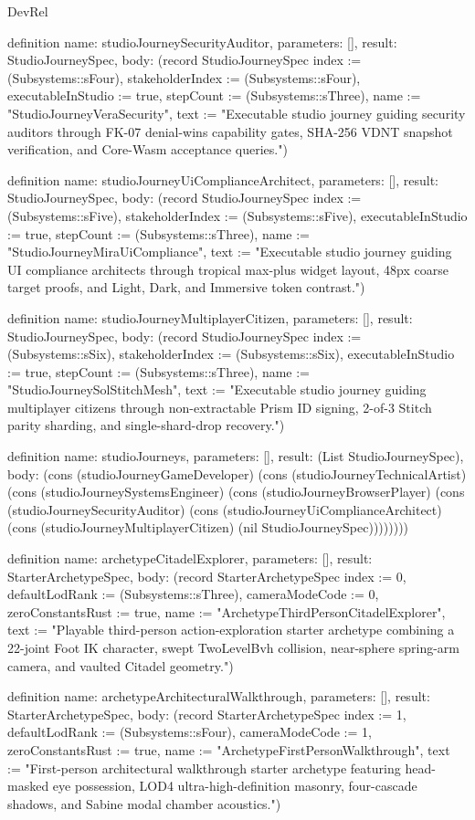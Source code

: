 \begin{lexlean}{DevRel}
\begin{semanticmodule}
definition{
  name: studioJourneySecurityAuditor,
  parameters: [],
  result: StudioJourneySpec,
  body: (record StudioJourneySpec {index := (Subsystems::sFour), stakeholderIndex := (Subsystems::sFour), executableInStudio := true, stepCount := (Subsystems::sThree), name := "StudioJourneyVeraSecurity", text := "Executable studio journey guiding security auditors through FK-07 denial-wins capability gates, SHA-256 VDNT snapshot verification, and Core-Wasm acceptance queries."})
}

definition{
  name: studioJourneyUiComplianceArchitect,
  parameters: [],
  result: StudioJourneySpec,
  body: (record StudioJourneySpec {index := (Subsystems::sFive), stakeholderIndex := (Subsystems::sFive), executableInStudio := true, stepCount := (Subsystems::sThree), name := "StudioJourneyMiraUiCompliance", text := "Executable studio journey guiding UI compliance architects through tropical max-plus widget layout, 48px coarse target proofs, and Light, Dark, and Immersive token contrast."})
}

definition{
  name: studioJourneyMultiplayerCitizen,
  parameters: [],
  result: StudioJourneySpec,
  body: (record StudioJourneySpec {index := (Subsystems::sSix), stakeholderIndex := (Subsystems::sSix), executableInStudio := true, stepCount := (Subsystems::sThree), name := "StudioJourneySolStitchMesh", text := "Executable studio journey guiding multiplayer citizens through non-extractable Prism ID signing, 2-of-3 Stitch parity sharding, and single-shard-drop recovery."})
}

definition{
  name: studioJourneys,
  parameters: [],
  result: (List StudioJourneySpec),
  body: (cons (studioJourneyGameDeveloper) (cons (studioJourneyTechnicalArtist) (cons (studioJourneySystemsEngineer) (cons (studioJourneyBrowserPlayer) (cons (studioJourneySecurityAuditor) (cons (studioJourneyUiComplianceArchitect) (cons (studioJourneyMultiplayerCitizen) (nil StudioJourneySpec))))))))
}

definition{
  name: archetypeCitadelExplorer,
  parameters: [],
  result: StarterArchetypeSpec,
  body: (record StarterArchetypeSpec {index := 0, defaultLodRank := (Subsystems::sThree), cameraModeCode := 0, zeroConstantsRust := true, name := "ArchetypeThirdPersonCitadelExplorer", text := "Playable third-person action-exploration starter archetype combining a 22-joint Foot IK character, swept TwoLevelBvh collision, near-sphere spring-arm camera, and vaulted Citadel geometry."})
}

definition{
  name: archetypeArchitecturalWalkthrough,
  parameters: [],
  result: StarterArchetypeSpec,
  body: (record StarterArchetypeSpec {index := 1, defaultLodRank := (Subsystems::sFour), cameraModeCode := 1, zeroConstantsRust := true, name := "ArchetypeFirstPersonWalkthrough", text := "First-person architectural walkthrough starter archetype featuring head-masked eye possession, LOD4 ultra-high-definition masonry, four-cascade shadows, and Sabine modal chamber acoustics."})
}


\end{semanticmodule}
\end{lexlean}
